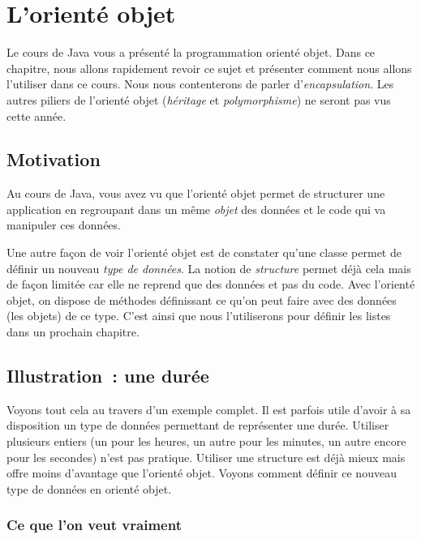 \chapter{L'orienté objet}

	Le cours de Java vous a présenté la programmation orienté objet.
	Dans ce chapitre, nous allons rapidement revoir ce sujet
	et présenter comment nous allons l'utiliser dans ce cours.
	Nous nous contenterons de parler d'\textit{encapsulation}. 
	Les autres piliers de l'orienté objet 
	(\textit{héritage} et \textit{polymorphisme}) 
	ne seront pas vus cette année.

\section{Motivation}

	Au cours de Java,
	vous avez vu que l'orienté objet permet de structurer une
	application en regroupant dans un même \emph{objet}
	des données et le code qui va manipuler ces données.
	
	Une autre façon de voir l'orienté objet
	est de constater qu'une classe permet de définir 
	un nouveau \emph{type de données}.
	La notion de \emph{structure} permet déjà cela mais de façon limitée
	car elle ne reprend que des données et pas du code.
	Avec l'orienté objet, 
	on dispose de méthodes définissant ce qu'on peut faire avec des données
	(les objets) de ce type.
	C'est ainsi que nous l'utiliserons pour définir les listes 
	dans un prochain chapitre.

	
\section{Illustration~: une durée}

	Voyons tout cela au travers d'un exemple complet.
	Il est parfois utile d'avoir à sa disposition un type
	de données permettant de représenter une durée.	
	Utiliser plusieurs entiers (un pour les heures, un autre pour les minutes,
	un autre encore pour les secondes) n'est pas pratique.
	Utiliser une structure est déjà mieux mais offre moins d'avantage
	que l'orienté objet.	
	Voyons comment définir ce nouveau type de données en orienté objet.
	
	\subsection{Ce que l’on veut vraiment}
	

